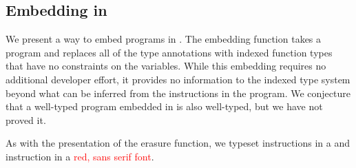 \subsection{Embedding \wasm in \name}
\label{subsec:Embedding}
We present a way to embed \wasm programs in \name.
The embedding function takes a \wasm program and replaces all of the type annotations with indexed function types that have no constraints on the variables.
While this embedding requires no additional developer effort, it provides no information to the indexed type system beyond what can be inferred from the instructions in the program.
We conjecture that a well-typed \wasm program embedded in \name is also well-typed, but we have not proved it.

As with the presentation of the erasure function, we typeset \name instructions in a  and \wasm instruction in a \textcolor{red}{\textsf{red, sans serif font}}.

